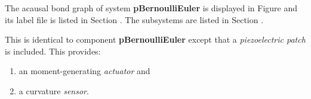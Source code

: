 

   The acausal bond graph of system \textbf{pBernoulliEuler} is
   displayed in Figure  and its label
   file is listed in Section .
   The subsystems are listed in Section .

This is identical to component  \textbf{pBernoulliEuler} except that a
\emph{piezoelectric patch} is included. This provides:
\begin{enumerate}
\item an moment-generating \emph{actuator} and
\item a curvature \emph{sensor}.
\end{enumerate}
